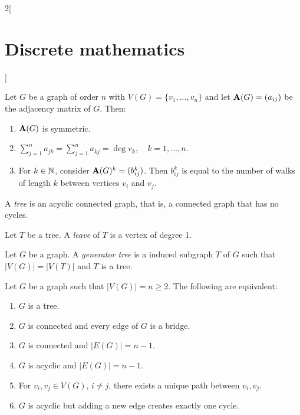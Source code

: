 \documentclass[../../../main.tex]{subfiles}
\begin{document}
\begin{multicols}{2}[\section{Discrete mathematics}]
\begin{definition}
    \end{definition}
    \begin{prop}
        Let $G$ be a graph of order $n$ with $V(G)=\{v_1,\ldots,v_n\}$ and let $\boldsymbol{\mathrm{A}}(G)=(a_{ij})$ be the adjacency matrix of $G$. Then:
        \begin{enumerate}
            \item $\boldsymbol{\mathrm{A}}(G)$ is symmetric.
            \item $\displaystyle\sum_{j=1}^n a_{jk}=\sum_{j=1}^n a_{kj}=\deg v_k,\quad k=1,\ldots,n$.
            \item For $k\in\mathbb{N} $, consider $\boldsymbol{\mathrm{A}}(G)^k=(b_{ij}^k)$. Then $b_{ij}^k$ is equal to the number of walks of length $k$ between vertices $v_i$ and $v_j$.
        \end{enumerate}
    \end{prop}
    \begin{definition}
        A \textit{tree} is an acyclic connected graph, that is, a connected graph that has no cycles.
    \end{definition}
    \begin{definition}
        Let $T$ be a tree. A \textit{leave} of $T$ is a vertex of degree 1.
    \end{definition}
    \begin{definition}
        Let $G$ be a graph. A \textit{generator tree} is a induced subgraph $T$ of $G$ such that $|V(G)|=|V(T)|$ and $T$ is a tree.
    \end{definition}
    \begin{prop}
        Let $G$ be a graph such that $|V(G)|=n\geq 2$. The following are equivalent:
        \begin{enumerate}
            \item $G$ is a tree.
            \item $G$ is connected and every edge of $G$ is a bridge.
            \item $G$ is connected and $|E(G)|=n-1$.
            \item $G$ is acyclic and $|E(G)|=n-1$.
            \item For $v_i,v_j\in V(G)$, $i\ne j$, there exists a unique path between $v_i,v_j$.
            \item $G$ is acyclic but adding a new edge creates exactly one cycle.
        \end{enumerate}
    \end{prop}
    \begin{definition}

\end{definition}
\end{multicols}
\end{document}
